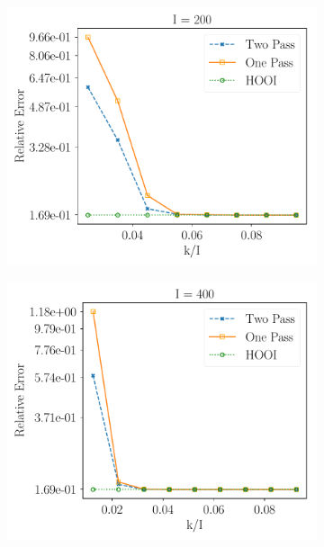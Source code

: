 \begin{figure}[H]
\begin{subfigure}{0.32\textwidth}
    \includegraphics[scale = 0.3]{figure/sed_n200.pdf}
    \end{subfigure}
    \begin{subfigure}{0.32\textwidth}
    \includegraphics[scale = 0.3]{figure/sed_n400.pdf}
    \end{subfigure}
    \begin{subfigure}{0.32\textwidth}

\end{subfigure}
\end{figure}
